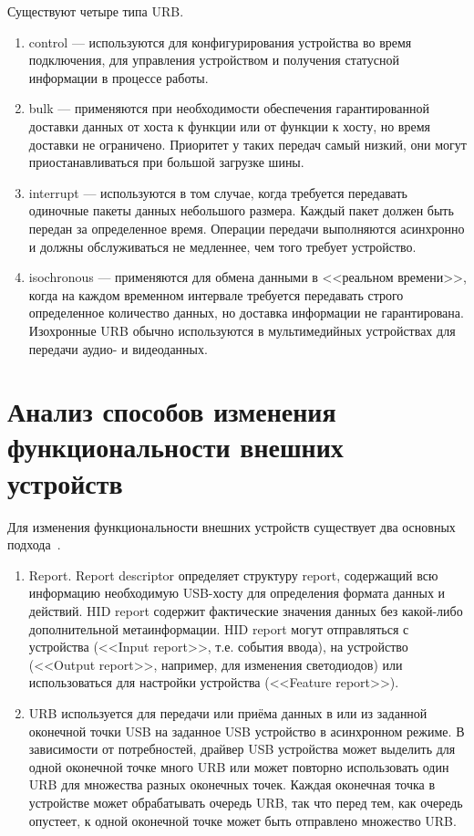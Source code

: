 Существуют четыре типа URB.
\begin{enumerate}
	\item control --- используются для конфигурирования устройства во время подключения, для управления устройством и получения статусной информации в процессе работы.
	\item bulk --- применяются при необходимости обеспечения гарантированной доставки данных от хоста к 	функции или от функции к хосту, но время доставки не ограничено. Приоритет у таких передач самый низкий, они могут приостанавливаться при большой загрузке шины. 
	\item interrupt --- используются в том случае, 	когда требуется передавать одиночные пакеты данных небольшого размера. Каждый пакет должен быть передан за определенное время. Операции передачи выполняются асинхронно и должны обслуживаться не медленнее, чем того требует устройство.
	\item isochronous --- применяются для обмена данными в <<реальном времени>>, когда на каждом временном интервале требуется передавать строго определенное количество данных, но доставка информации не гарантирована. Изохронные URB обычно используются в 	мультимедийных устройствах для передачи аудио- и видеоданных.
\end{enumerate}

\section{Анализ способов изменения функциональности внешних устройств}

Для изменения функциональности внешних устройств существует два основных подхода~\cite{ryaz}. 

\begin{enumerate}
	\item Report. Report descriptor определяет структуру report, содержащий всю информацию необходимую USB-хосту для определения формата данных и действий. HID report содержит фактические значения данных без какой-либо дополнительной метаинформации. HID report могут отправляться с устройства (<<Input report>>, т.е. события ввода), на устройство (<<Output report>>, например, для изменения светодиодов) или использоваться для настройки устройства (<<Feature report>>).
	\item URB используется для передачи или приёма данных в или из заданной оконечной точки USB на заданное USB устройство в асинхронном режиме. В зависимости от потребностей, драйвер USB устройства может выделить для одной оконечной точке много URB или может повторно использовать один URB для множества разных оконечных точек. Каждая оконечная точка в устройстве может обрабатывать очередь URB, так что перед тем, как очередь опустеет, к одной оконечной точке может быть отправлено множество URB. 
\end{enumerate}

